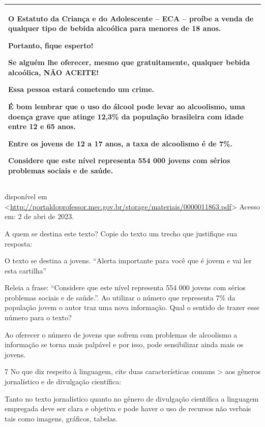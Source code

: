 {\begin{longtable}[]{@{}
  >{\raggedright\arraybackslash}p{}@{}}
O Estatuto da Criança e do Adolescente -- ECA -- proíbe a venda de
qualquer tipo de bebida alcoólica para menores de 18 anos.

Portanto, fique esperto!

Se alguém lhe oferecer, mesmo que gratuitamente, qualquer bebida
alcoólica, NÃO ACEITE!

Essa pessoa estará cometendo um crime.

É bom lembrar que o uso do álcool pode levar ao alcoolismo, uma doença
grave que atinge 12,3\% da população brasileira com idade entre 12 e 65
anos.

Entre os jovens de 12 a 17 anos, a taxa de alcoolismo é de 7\%.

Considere que este nível representa 554 000 jovens com sérios problemas
sociais e de saúde. \\
\bottomrule
\end{longtable}

disponível em
\textless{}\href{http://portaldoprofessor.mec.gov.br/storage/materiais/0000011863.pdf}{\uline{http://portaldoprofessor.mec.gov.br/storage/materiais/0000011863.pdf}}\textgreater{}
Acesso em: 2 de abri de 2023.

\begin{escolha}
  \item A quem se destina este texto? Copie do texto um trecho que justifique
  sua resposta:

O texto se destina a jovens. ``Alerta importante para você que é jovem e
vai ler esta cartilha''


  \item Releia a frase: ``Considere que este nível representa 554 000 jovens
  com sérios problemas sociais e de saúde.''. Ao utilizar o número que
  representa 7\% da população jovem o autor traz uma nova informação.
  Qual o sentido de trazer esse número para o texto?

\end{escolha}

Ao oferecer o número de jovens que sofrem com problemas de alcoolismo a
informação se torna mais palpável e por isso, pode sensibilizar ainda
mais os jovens.

\num{7} No que diz respeito à linguagem, cite duas características comuns \textgreater{} aos gêneros jornalístico e de divulgação científica:

Tanto no texto jornalístico quanto no gênero de divulgação científica a
linguagem empregada deve ser clara e objetiva e pode haver o uso de
recursos não verbais tais como imagens, gráficos, tabelas.

}
